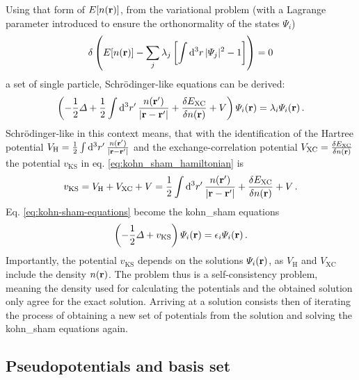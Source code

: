 \documentclass[main.tex]{subfiles}
\begin{document}
Using that form of \(E[n(\vb{r})]\), from the variational problem (with a Lagrange parameter introduced to ensure the orthonormality of the states \(\Psi_i\))
\begin{align}
     \delta \left( E [n(\vb{r})] - \sum_j \lambda_j \left[\int \dd[3]{r} \vert \Psi_j \vert^2 - 1 \right] \right) = 0
\end{align}
a set of single particle, Schrödinger-like equations can be derived:
\begin{equation}\label{eq:kohn-sham-equations}
    \left(-\frac{1}{2} \Delta + \frac{1}{2} \int \dd[3]{r^{\prime}} \frac{n(\vb{r}^{\prime})}{\vert \vb{r} - \vb{r}^{\prime} \vert} + \fdv{E_{\mathrm{XC}}}{n(\vb{r})} + V\right) \Psi_i (\vb{r}) = \lambda_i \Psi_i (\vb{r})\,.
\end{equation}
Schrödinger-like in this context means, that with the identification of the Hartree potential \(V_{\mathrm{H}} = \frac{1}{2} \int \dd[3]{r^{\prime}} \frac{n(\vb{r}^{\prime})}{\vert \vb{r} - \vb{r}^{\prime} \vert}\) and the exchange-correlation potential \(V_{\mathrm{XC}} = \fdv{E_{\mathrm{XC}}}{n(\vb{r})}\) the potential \(v_{\mathrm{KS}}\) in eq. \ref{eq:kohn_sham_hamiltonian} is
\begin{equation}
    v_{\mathrm{KS}} =  V_{\mathrm{H}} + V_{\mathrm{XC}} + V = \frac{1}{2} \int \dd[3]{r^{\prime}} \frac{n(\vb{r}^{\prime})}{\vert \vb{r} - \vb{r}^{\prime} \vert} + \fdv{E_{\mathrm{XC}}}{n(\vb{r})} + V\,.
\end{equation}
Eq. \ref{eq:kohn-sham-equations} become the \acrshort{kohn_sham} equations
\begin{equation}
    \left(- \frac{1}{2} \Delta + v_{\mathrm{KS}}\right) \Psi_i (\vb{r}) = \epsilon_i \Psi_i (\vb{r})\,.
\end{equation}
Importantly, the potential \(v_{\mathrm{KS}}\) depends on the solutions \(\Psi_i (\vb{r})\), as \(V_{\mathrm{H}}\) and \(V_{\mathrm{XC}}\) include the density \(n(\vb{r})\).
The problem thus is a self-consistency problem, meaning the density used for calculating the potentials and the obtained solution only agree for the exact solution.
Arriving at a solution consists then of iterating the process of obtaining a new set of potentials from the solution and solving the \acrshort{kohn_sham} equations again.

\subsection{Pseudopotentials and basis set}\label{sub:theory_basis_set}
\end{document}
